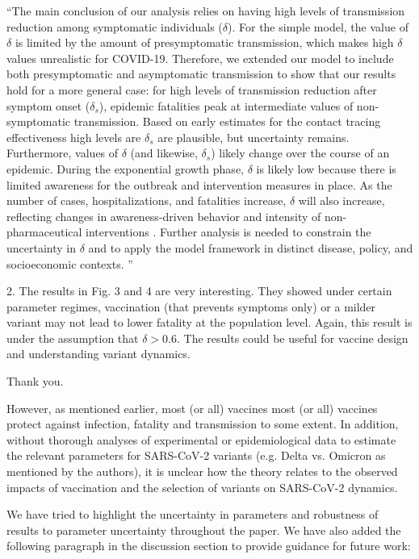 \documentclass[12pt]{article}
\newcommand{\revtext}{\textsf}
\begin{document}
``The main conclusion of our analysis relies on having high levels of transmission reduction among symptomatic individuals ($\delta$). 
For the simple model, the value of $\delta$ is limited by the amount of presymptomatic transmission, which makes high $\delta$ values unrealistic for COVID-19.
Therefore, we extended our model to include both presymptomatic and asymptomatic transmission to show that our results hold for a more general case: for high levels of transmission reduction after symptom onset ($\delta_s$), epidemic fatalities peak at intermediate values of non-symptomatic transmission.
Based on early estimates for the contact tracing effectiveness \citep{kucharski2020effectiveness} high levels are $\delta_s$ are plausible, but uncertainty remains. 
Furthermore, values of $\delta$ (and likewise, $\delta_s$) likely change over the course of an epidemic.
During the exponential growth phase, $\delta$ is likely low because there is limited awareness for the outbreak and intervention measures in place.
As the number of cases, hospitalizations, and fatalities increase, $\delta$ will also increase, reflecting changes in awareness-driven behavior and intensity of non-pharmaceutical interventions \citep{weitz2020awareness}.
Further analysis is needed to constrain the uncertainty in $\delta$ and to apply the model framework in distinct disease, policy, and socioeconomic contexts. ''

\revtext{2. The results in Fig. 3 and 4 are very interesting. They showed under certain parameter regimes, vaccination (that prevents symptoms only) or a milder variant may not lead to lower fatality at the population level. Again, this result is under the assumption that $\delta>0.6$. The results could be useful for vaccine design and understanding variant dynamics.}

Thank you.

\revtext{However, as mentioned earlier, most (or all) vaccines most (or all) vaccines protect against infection, fatality and transmission to some extent. In addition, without thorough analyses of experimental or epidemiological data to estimate the relevant parameters for SARS-CoV-2 variants (e.g. Delta vs. Omicron as mentioned by the authors), it is unclear how the theory relates to the observed impacts of vaccination and the selection of variants on SARS-CoV-2 dynamics.} 

We have tried to highlight the uncertainty in parameters and robustness of results to parameter uncertainty throughout the paper. 
We have also added the following paragraph in the discussion section to provide guidance for future work:
\end{document}

